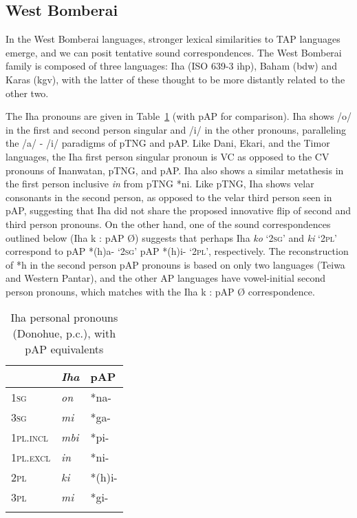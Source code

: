 \subsection{West Bomberai}
In the West Bomberai languages, stronger lexical similarities to TAP languages emerge, and we can posit tentative sound correspondences. The West Bomberai family is composed of three languages: Iha (ISO 639-3 ihp), Baham (bdw) and Karas (kgv), with the latter of these thought to be more distantly related to the other two.

The Iha pronouns are given in Table~\ref{tab:4:iha_pronouns} (with pAP for comparison). Iha shows /o/ in the first and second person singular and /i/ in the other pronouns, paralleling the /a/ - /i/ paradigms of pTNG and pAP. Like Dani, Ekari, and the Timor languages, the Iha first person singular pronoun is VC as opposed to the CV pronouns of Inanwatan, pTNG, and pAP. Iha also shows a similar metathesis in the first person inclusive \textit{in} from pTNG *ni. Like pTNG, Iha shows velar consonants in the second person, as opposed to the velar third person seen in pAP, suggesting that Iha did not share the proposed innovative flip of second and third person pronouns. On the other hand, one of the sound correspondences outlined below (Iha k : pAP {\O}) suggests that perhaps Iha \textit{ko} `\textsc{2sg}' and \textit{ki} `\textsc{2pl}' correspond to pAP *(h)a- `\textsc{2sg}' pAP *(h)i- `\textsc{2pl}', respectively. The reconstruction of *h in the second person pAP pronouns is based on only two languages (Teiwa and Western Pantar),
and the other AP languages have vowel-initial second person pronouns, which matches with the Iha k : pAP {\O} correspondence.


\begin{table}[h]

\caption{Iha personal pronouns (Donohue, p.c.), with pAP equivalents}
\label{tab:4:iha_pronouns}
\begin{tabularx}{\textwidth}{X>{\it}XX}
\lsptoprule
 &\rm Iha&\rm pAP\\ 
 \midrule
\textsc{1sg}&on&*na-\\ 
\textsc{3sg}&mi&*ga-\\ 
\textsc{1pl.incl}&mbi&*pi-\\ 
\textsc{1pl.excl}&in&*ni-\\ 
\textsc{2pl}&ki&*(h)i-\\ 
\textsc{3pl}&mi&*gi-\\ 
\lspbottomrule
\end{tabularx}
\end{table}

